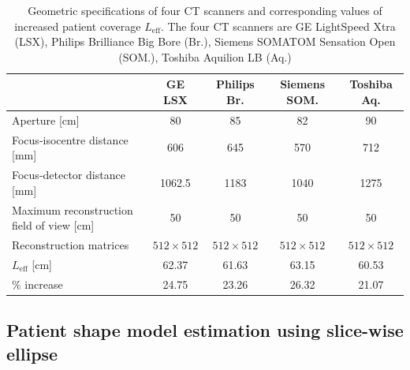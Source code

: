 \documentclass[]{spie}
\begin{document}
\begin{table}
\begin{center}
\begin{tabular}{l cccc}
\hline 
\hline 
 & \textbf{GE LSX} & \textbf{Philips Br.} &\textbf{ Siemens SOM.}  & \textbf{Toshiba Aq.}  \\ 
\hline 
Aperture [cm]  & 80 & 85 & 82 & 90 \\ 
Focus-isocentre distance [mm]  & 606 & 645 & 570 & 712 \\ 
Focus-detector distance [mm]  & 1062.5 & 1183 & 1040 & 1275 \\ 
Maximum reconstruction field of view [cm] & 50 & 50 & 50 & 50 \\ 
Reconstruction matrices  & $512 \times 512$ & $512 \times 512$ & $512 \times 512$ & $512 \times 512$ \\ 
\hline 
$L_{\mathrm{eff}}$ [cm] & 62.37 & 61.63 & 63.15 & 60.53 \\ 
\% increase & 24.75 & 23.26 & 26.32 & 21.07 \\ 
\hline 
\hline 
\end{tabular} 
\caption{Geometric specifications of four CT scanners and corresponding values of increased patient coverage $L_{\mathrm{eff}}$. The four CT scanners are GE LightSpeed Xtra (LSX), Philips Brilliance Big Bore (Br.), Siemens SOMATOM Sensation Open (SOM.), Toshiba Aquilion LB (Aq.) \label{tab:scanner_geoms}}
\end{center}
\end{table}
\subsection{Patient shape model estimation using slice-wise ellipse}
\label{ssec:ellipse-estimation}

\end{document}
